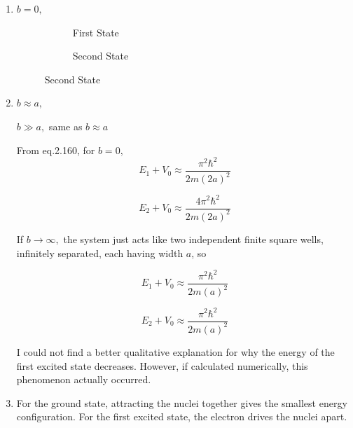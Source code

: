 \begin{enumerate}
    \item 
    $b=0,$
    \begin{figure}[htbp]
    \centering
    \begin{subfigure}{0.49\textwidth}
        \centering
        \caption{First State}
        \label{fig:sub1}
    \end{subfigure}
    \hfill
    \begin{subfigure}{0.48\textwidth}
        \centering
        \caption{Second State}
        \label{fig:sub2}
    \end{subfigure}
\end{figure}

\item 
    $b\approx a,$
    

    $b\gg a,$ same as $b\approx a$

    From eq.2.160, for $b=0,$ 
    $$
    E_1+V_0\approx \frac{\pi^2\hbar^2}{2m(2a)^2} 
    $$

    $$
    E_2+V_0\approx \frac{4\pi^2\hbar^2}{2m(2a)^2} 
    $$


    If $b\to\infty,$ the system just acts like two independent finite square wells, infinitely separated, each having width $a$,
    so

    $$
    E_1+V_0\approx \frac{\pi^2\hbar^2}{2m(a)^2} 
    $$

    $$
    E_2+V_0\approx \frac{\pi^2\hbar^2}{2m(a)^2} 
    $$

    I could not find a better qualitative explanation for  why the energy of the first excited state decreases. However, if calculated numerically, this phenomenon actually occurred.

\item For the ground state, attracting the nuclei together gives the smallest energy configuration. For the first excited state, the electron drives the nuclei apart. 
    
\end{enumerate}


